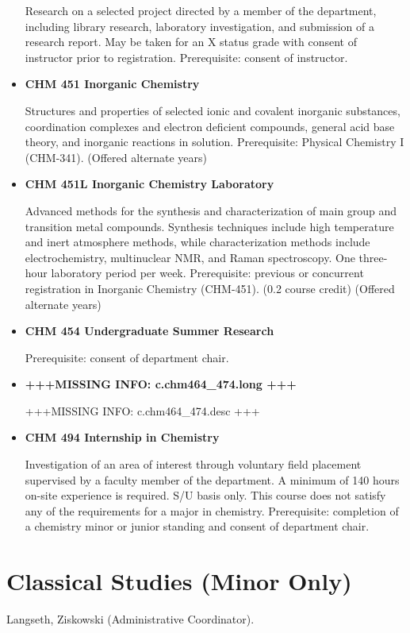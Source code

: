 \documentclass[
  letterpaper,
]{scrbook}
\begin{document}
\begin{itemize}
  Research on a selected project directed by a member of the department,
  including library research, laboratory investigation, and submission
  of a research report. May be taken for an X status grade with consent
  of instructor prior to registration. Prerequisite: consent of
  instructor.
\item
  \textbf{CHM 451 Inorganic Chemistry}

  Structures and properties of selected ionic and covalent inorganic
  substances, coordination complexes and electron deficient compounds,
  general acid base theory, and inorganic reactions in solution.
  Prerequisite: Physical Chemistry I (CHM-341). (Offered alternate
  years)
\item
  \textbf{CHM 451L Inorganic Chemistry Laboratory}

  Advanced methods for the synthesis and characterization of main group
  and transition metal compounds. Synthesis techniques include high
  temperature and inert atmosphere methods, while characterization
  methods include electrochemistry, multinuclear NMR, and Raman
  spectroscopy. One three-hour laboratory period per week. Prerequisite:
  previous or concurrent registration in Inorganic Chemistry (CHM-451).
  (0.2 course credit) (Offered alternate years)
\item
  \textbf{CHM 454 Undergraduate Summer Research}

  Prerequisite: consent of department chair.
\item
  \textbf{+++MISSING INFO: c.chm464\_474.long +++}

  +++MISSING INFO: c.chm464\_474.desc +++
\item
  \textbf{CHM 494 Internship in Chemistry}

  Investigation of an area of interest through voluntary field placement
  supervised by a faculty member of the department. A minimum of 140
  hours on-site experience is required. S/U basis only. This course does
  not satisfy any of the requirements for a major in chemistry.
  Prerequisite: completion of a chemistry minor or junior standing and
  consent of department chair.
\end{itemize}

\section{Classical Studies (Minor
Only)}\label{classical-studies-minor-only}

Langseth, Ziskowski (Administrative Coordinator).
\end{document}
